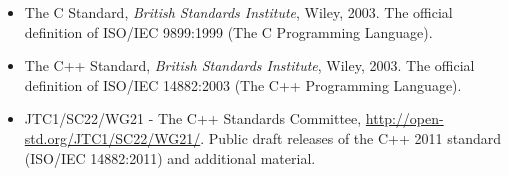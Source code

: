 \documentclass[a4paper]{scrartcl}
\begin{document}
\begin{itemize}
	\item The C Standard, \emph{British Standards Institute}, Wiley, 2003. The official definition of ISO/IEC 9899:1999 (The C Programming Language).
	\item The C++ Standard, \emph{British Standards Institute}, Wiley, 2003. The official definition of ISO/IEC 14882:2003 (The C++ Programming Language).
	\item JTC1/SC22/WG21 - The C++ Standards Committee, \url{http://open-std.org/JTC1/SC22/WG21/}. Public draft releases of the C++ 2011 standard (ISO/IEC 14882:2011) and additional material.
\end{itemize}
\end{document}
